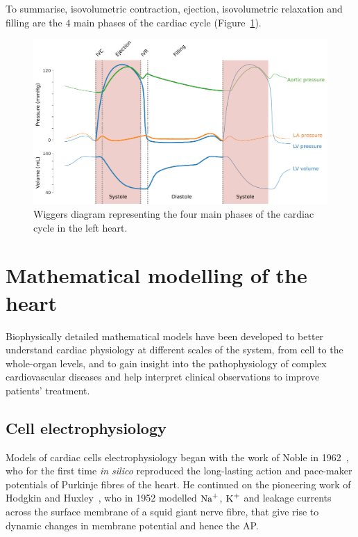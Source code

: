\vspace{0.2cm}
To summarise, isovolumetric contraction, ejection, isovolumetric relaxation and filling are the $4$ main phases of the cardiac cycle (Figure~\ref{fig:wiggersdiagram}).

\begin{figure}[!ht]
    \myfloatalign
    \includegraphics[width=\textwidth]{figures/chapter01/wiggers_diagram.pdf}
    \caption{Wiggers diagram representing the four main phases of the cardiac cycle in the left heart.}
    \label{fig:wiggersdiagram}
\end{figure}


%
%
%
\section{Mathematical modelling of the heart}\label{sec:ch1mathematical_modelling_of_the_heart}
Biophysically detailed mathematical models have been developed to better understand cardiac physiology at different scales of the system, from cell to the whole-organ levels, and to gain insight into the pathophysiology of complex cardiovascular diseases and help interpret clinical observations to improve patients' treatment.


%
%
%
\subsection{Cell electrophysiology}\label{sec:cell_ep_modelling}
Models of cardiac cells electrophysiology began with the work of Noble in 1962~\cite{Noble:1962}, who for the first time \textit{in silico} reproduced the long-lasting action and pace-maker potentials of Purkinje fibres of the heart. He continued on the pioneering work of Hodgkin and Huxley~\cite{Hodgkin:1952}, who in 1952 modelled $\textrm{Na}^{+}$, $\textrm{K}^{+}$ and leakage currents across the surface membrane of a squid giant nerve fibre, that give rise to dynamic changes in membrane potential and hence the AP.

